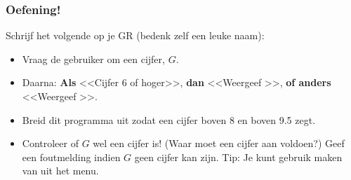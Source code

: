 \begin{frame}
\frametitle{Oefening!}

Schrijf het volgende  op je GR (bedenk zelf een leuke naam):

\begin{itemize}
  \item Vraag de gebruiker om een cijfer, $G$.
  \item Daarna: \textbf{Als} <<Cijfer 6 of hoger>>, \textbf{dan} <<Weergeef >>, \textbf{of anders} <<Weergeef >>.
  \item Breid dit programma uit zodat een cijfer boven 8  en boven 9.5  zegt.
  \item Controleer of $G$ wel een cijfer is! (Waar moet een cijfer aan voldoen?) Geef een foutmelding indien $G$ geen cijfer kan zijn.
  		\footnotesize{Tip: Je kunt gebruik maken van  uit het \tiPRGM{} menu.}
\end{itemize}


\end{frame}


